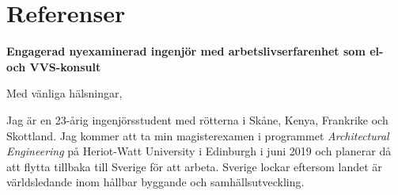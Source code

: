 \documentclass[11pt,a4paper,roman]{moderncv}        %
\begin{document}
\section{Referenser}


%


\clearpage
\date{\today}
\opening{\textbf{Engagerad nyexaminerad ingenj{\"o}r med arbetslivserfarenhet som el- och VVS-konsult}}
\closing{Med v{\"a}nliga h{\"a}lsningar,}
\makelettertitle

Jag {\"a}r en 23-{\aa}rig ingenj{\"o}rsstudent med r{\"o}tterna i Sk{\aa}ne, Kenya, Frankrike och Skottland.
Jag kommer att ta min magisterexamen i programmet \textit{Architectural Engineering} p{\aa} Heriot-Watt University i Edinburgh i juni 2019 och planerar d{\aa} att flytta tillbaka till Sverige f{\"o}r att arbeta.
Sverige lockar eftersom landet {\"a}r v{\"a}rldsledande inom h{\aa}llbar byggande och samh{\"a}llsutveckling.
\end{document}
